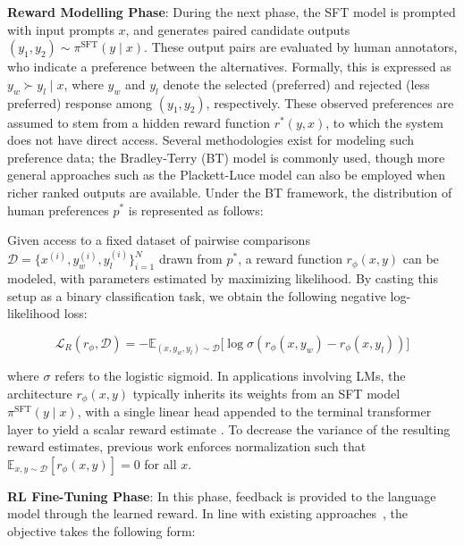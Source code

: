 \textbf{Reward Modelling Phase}: During the next phase, the SFT model is prompted with input prompts $x$, and generates paired candidate outputs $(y_1, y_2) \sim \pi^\text{SFT}(y \mid x)$. These output pairs are evaluated by human annotators, who indicate a preference between the alternatives. Formally, this is expressed as $y_w\succ y_l \mid x$, where $y_w$ and $y_l$ denote the selected (preferred) and rejected (less preferred) response among $(y_1, y_2)$, respectively. These observed preferences are assumed to stem from a hidden reward function $r^*(y, x)$, to which the system does not have direct access. Several methodologies exist for modeling such preference data; the Bradley-Terry (BT) model \cite{bradley1952rankanalysis} is commonly used, though more general approaches such as the Plackett-Luce model \citep{plackett1975analysis, luce2012individual} can also be employed when richer ranked outputs are available. Under the BT framework, the distribution of human preferences $p^*$ is represented as follows:

Given access to a fixed dataset of pairwise comparisons $\mathcal{D}=\bigl\{x^{(i)}, y_w^{(i)}, y_l^{(i)}\bigr\}_{i=1}^N$ drawn from $p^*$, a reward function $r_{\phi}(x, y)$ can be modeled, with parameters estimated by maximizing likelihood. By casting this setup as a binary classification task, we obtain the following negative log-likelihood loss:

\begin{equation}\label{eq:reward_model}
    \mathcal{L}_R(r_{\phi}, \mathcal{D}) = -\mathbb{E}_{(x, y_w, y_l)\sim \mathcal{D}}\bigl[\log \sigma(r_{\phi}(x, y_w)- r_{\phi}(x, y_l))\bigr]
\end{equation}

where $\sigma$ refers to the logistic sigmoid. In applications involving LMs, the architecture $r_{\phi}(x, y)$ typically inherits its weights from an SFT model $\pi^\text{SFT}(y \mid x)$, with a single linear head appended to the terminal transformer layer to yield a scalar reward estimate \cite{ziegler2020finetuning}. To decrease the variance of the resulting reward estimates, previous work enforces normalization such that  $\mathbb{E}_{x,y\sim \mathcal{D}}\left[r_\phi(x, y)\right] = 0$ for all $x$.

\textbf{RL Fine-Tuning Phase}: In this phase, feedback is provided to the language model through the learned reward. In line with existing approaches~\citep{jaques2017sequence, jaques2020human}, the objective takes the following form:

